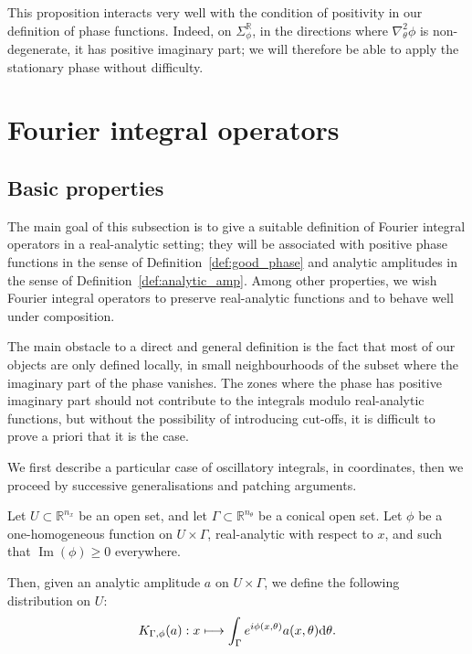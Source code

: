 \documentclass[AHL,Unicode,longabstracts,published]{cedram}
\DeclareMathOperator{\im}{Im}
\newcommand\1{\mathds{1}}
\newcommand{\R}{\mathbb{R}}
\newcommand{\dd}{\mathrm{d}}
\let\oldmapsto\mapsto
\renewcommand*{\mapsto}{\mathchoice{\longmapsto}{\oldmapsto}{\oldmapsto}{\oldmapsto}}
\begin{document}
This proposition interacts very well with the condition of positivity in our definition of phase functions. Indeed, on $\Sigma_{\phi}^{\R}$, in the directions where $\nabla^2_{\theta}\phi$ is non-degenerate, it has positive imaginary part; we will therefore be able to apply the stationary phase without difficulty.


\section{Fourier integral operators}\label{sec:four-integr-oper}

\subsection{Basic properties}\label{sec:first-properties}

The main goal of this subsection is to give a suitable definition of Fourier integral operators in a real-analytic setting; they will be associated with positive phase functions in the sense of Definition~\ref{def:good_phase} and analytic amplitudes in the sense of Definition~\ref{def:analytic_amp}. Among other properties, we wish Fourier integral operators to preserve real-analytic functions and to behave well under composition.

The main obstacle to a direct and general definition is the fact that most of our objects are only defined locally, in small neighbourhoods of the subset where the imaginary part of the phase vanishes. The zones where the phase has positive imaginary part should not contribute to the integrals modulo real-analytic functions, but without the possibility of introducing cut-offs, it is difficult to prove a priori that it is the case.

We first describe a particular case of oscillatory integrals, in coordinates, then we proceed by successive generalisations and patching arguments.

\begin{defi}\label{def:osc_int}
Let $U\subset \R^{n_x}$ be an open set, and let $\Gamma\subset \R^{n_{\theta}}$ be a conical open set. Let $\phi$ be a one-homogeneous function on $U\times \Gamma$, real-analytic with respect to $x$, and such that $\im(\phi)\geq 0$ everywhere.

Then, given an analytic amplitude $a$ on $U\times \Gamma$, we define the following distribution on $U$:
\[
K_{\Gamma,\phi}(a):x\mapsto \int_{\Gamma} e^{i\phi(x,\theta)}a(x,\theta)\dd \theta.
\]
\end{defi}
\end{document}
